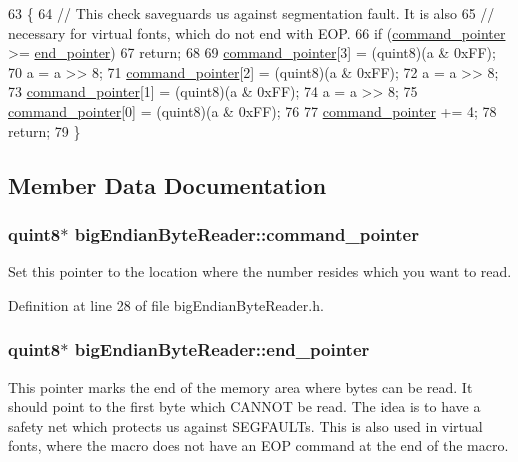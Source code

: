 \begin{DoxyCode}
63 \{
64   \textcolor{comment}{// This check saveguards us against segmentation fault. It is also}
65   \textcolor{comment}{// necessary for virtual fonts, which do not end with EOP.}
66   \textcolor{keywordflow}{if} (\hyperlink{classbigEndianByteReader_aa8919f6fe116fd3230337675fd23abac}{command\_pointer} >= \hyperlink{classbigEndianByteReader_ace2790221530572c87c58f1f77924beb}{end\_pointer})
67     \textcolor{keywordflow}{return};
68 
69   \hyperlink{classbigEndianByteReader_aa8919f6fe116fd3230337675fd23abac}{command\_pointer}[3] = (quint8)(a & 0xFF);
70   a = a >> 8;
71   \hyperlink{classbigEndianByteReader_aa8919f6fe116fd3230337675fd23abac}{command\_pointer}[2] = (quint8)(a & 0xFF);
72   a = a >> 8;
73   \hyperlink{classbigEndianByteReader_aa8919f6fe116fd3230337675fd23abac}{command\_pointer}[1] = (quint8)(a & 0xFF);
74   a = a >> 8;
75   \hyperlink{classbigEndianByteReader_aa8919f6fe116fd3230337675fd23abac}{command\_pointer}[0] = (quint8)(a & 0xFF);
76 
77   \hyperlink{classbigEndianByteReader_aa8919f6fe116fd3230337675fd23abac}{command\_pointer} += 4;
78   \textcolor{keywordflow}{return};
79 \}
\end{DoxyCode}


\subsection{Member Data Documentation}
\hypertarget{classbigEndianByteReader_aa8919f6fe116fd3230337675fd23abac}{
\subsubsection[{command\+\_\+pointer}]{\setlength{\rightskip}{0pt plus 5cm}quint8$\ast$ big\+Endian\+Byte\+Reader\+::command\+\_\+pointer}}\label{classbigEndianByteReader_aa8919f6fe116fd3230337675fd23abac}
Set this pointer to the location where the number resides which you want to read. 

Definition at line 28 of file big\+Endian\+Byte\+Reader.\+h.

\hypertarget{classbigEndianByteReader_ace2790221530572c87c58f1f77924beb}{
\subsubsection[{end\+\_\+pointer}]{\setlength{\rightskip}{0pt plus 5cm}quint8$\ast$ big\+Endian\+Byte\+Reader\+::end\+\_\+pointer}}\label{classbigEndianByteReader_ace2790221530572c87c58f1f77924beb}
This pointer marks the end of the memory area where bytes can be read. It should point to the first byte which C\+A\+N\+N\+O\+T be read. The idea is to have a safety net which protects us against S\+E\+G\+F\+A\+U\+L\+Ts. This is also used in virtual fonts, where the macro does not have an E\+O\+P command at the end of the macro. 

